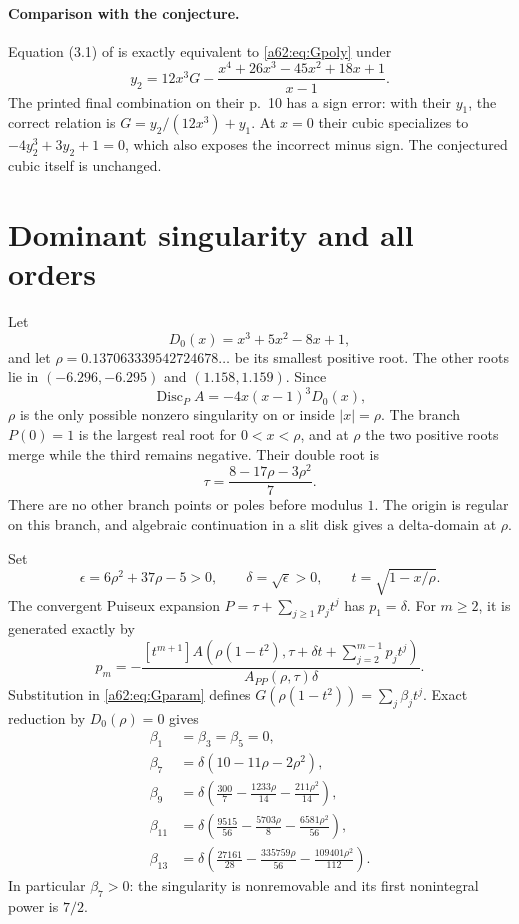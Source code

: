 \documentclass[11pt,letterpaper]{article}
\theoremstyle{remark}\newtheorem{remark}[theorem]{Remark}
\newcommand{\Disc}{\operatorname{Disc}}
\begin{document}
\paragraph{Comparison with the conjecture.}
Equation (3.1) of \cite{GK} is exactly equivalent to \eqref{a62:eq:Gpoly} under
\[
 y_2=12x^3G-\frac{x^4+26x^3-45x^2+18x+1}{x-1}.
\]
The printed final combination on their p.~10 has a sign error: with their $y_1$, the correct relation is $G=y_2/(12x^3)+y_1$. At $x=0$ their cubic specializes to $-4y_2^3+3y_2+1=0$, which also exposes the incorrect minus sign. The conjectured cubic itself is unchanged.

\section{Dominant singularity and all orders}\label{a62:sec:sing}
Let
\[
 D_0(x)=x^3+5x^2-8x+1,
\]
and let $\rho=0.137063339542724678\ldots$ be its smallest positive root. The other roots lie in $(-6.296,-6.295)$ and $(1.158,1.159)$. Since
\[
 \Disc_P A=-4x(x-1)^3D_0(x),
\]
$\rho$ is the only possible nonzero singularity on or inside $|x|=\rho$. The branch $P(0)=1$ is the largest real root for $0<x<\rho$, and at $\rho$ the two positive roots merge while the third remains negative. Their double root is
\[
 \tau=\frac{8-17\rho-3\rho^2}{7}.
\]
There are no other branch points or poles before modulus $1$. The origin is regular on this branch, and algebraic continuation in a slit disk gives a delta-domain at $\rho$.

Set
\[
 \epsilon=6\rho^2+37\rho-5>0,\qquad \delta=\sqrt\epsilon>0,
 \qquad t=\sqrt{1-x/\rho}.
\]
The convergent Puiseux expansion $P=\tau+\sum_{j\ge1}p_jt^j$ has $p_1=\delta$. For $m\ge2$, it is generated exactly by
\begin{equation}\label{a62:eq:puiseux}
 p_m=-\frac{[t^{m+1}]A\!\left(\rho(1-t^2),\tau+\delta t+\sum_{j=2}^{m-1}p_jt^j\right)}{A_{PP}(\rho,\tau)\delta}.
\end{equation}
Substitution in \eqref{a62:eq:Gparam} defines $G(\rho(1-t^2))=\sum_j\beta_jt^j$. Exact reduction by $D_0(\rho)=0$ gives
\begin{align*}
 \beta_1&=\beta_3=\beta_5=0,\\
 \beta_7&=\delta(10-11\rho-2\rho^2),\\
 \beta_9&=\delta\left(\frac{300}{7}-\frac{1233\rho}{14}-\frac{211\rho^2}{14}\right),\\
 \beta_{11}&=\delta\left(\frac{9515}{56}-\frac{5703\rho}{8}-\frac{6581\rho^2}{56}\right),\\
 \beta_{13}&=\delta\left(\frac{27161}{28}-\frac{335759\rho}{56}-\frac{109401\rho^2}{112}\right).
\end{align*}
In particular $\beta_7>0$: the singularity is nonremovable and its first nonintegral power is $7/2$.
\end{document}
